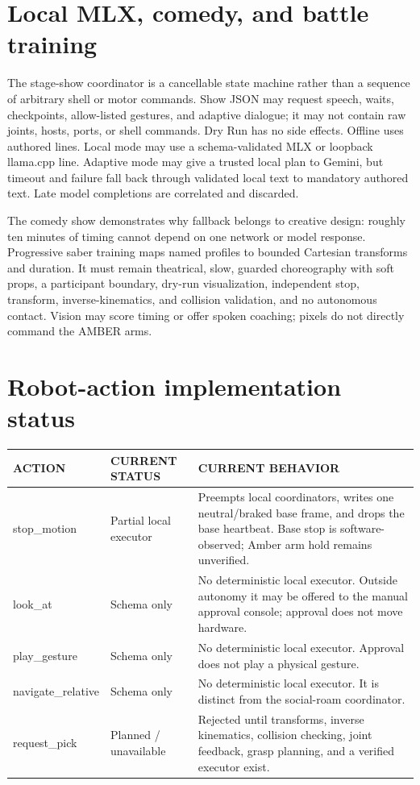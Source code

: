 \documentclass[10pt,openany]{book}
\begin{document}
\section{Local MLX, comedy, and battle training}


The stage-show coordinator is a cancellable state machine rather than a sequence of arbitrary shell or motor commands. Show JSON may request speech, waits, checkpoints, allow-listed gestures, and adaptive dialogue; it may not contain raw joints, hosts, ports, or shell commands. Dry Run has no side effects. Offline uses authored lines. Local mode may use a schema-validated MLX or loopback llama.cpp line. Adaptive mode may give a trusted local plan to Gemini, but timeout and failure fall back through validated local text to mandatory authored text. Late model completions are correlated and discarded.

The comedy show demonstrates why fallback belongs to creative design: roughly ten minutes of timing cannot depend on one network or model response. Progressive saber training maps named profiles to bounded Cartesian transforms and duration. It must remain theatrical, slow, guarded choreography with soft props, a participant boundary, dry-run visualization, independent stop, transform, inverse-kinematics, and collision validation, and no autonomous contact. Vision may score timing or offer spoken coaching; pixels do not directly command the AMBER arms.

\section{Robot-action implementation status}

\begin{tabularx}{\textwidth}{>{\ttfamily\scriptsize}p{1.35in} p{1.35in} X}
\toprule
ACTION & CURRENT STATUS & CURRENT BEHAVIOR\\
\midrule
stop\_motion & Partial local executor & Preempts local coordinators, writes one neutral/braked base frame, and drops the base heartbeat. Base stop is software-observed; Amber arm hold remains unverified.\\
look\_at & Schema only & No deterministic local executor. Outside autonomy it may be offered to the manual approval console; approval does not move hardware.\\
play\_gesture & Schema only & No deterministic local executor. Approval does not play a physical gesture.\\
navigate\_relative & Schema only & No deterministic local executor. It is distinct from the social-roam coordinator.\\
request\_pick & Planned / unavailable & Rejected until transforms, inverse kinematics, collision checking, joint feedback, grasp planning, and a verified executor exist.\\
\bottomrule
\end{tabularx}
\end{document}
